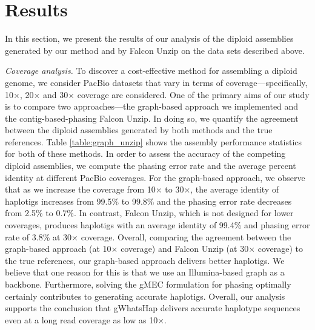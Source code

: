 \section{Results}
In this section, we present the results of our analysis of the diploid assemblies generated by our method and by Falcon Unzip on the data sets described above.

\textit{Coverage analysis.} To discover a cost-effective method for assembling a diploid genome, we consider PacBio datasets that vary in terms of coverage---specifically, 10$\times$, 20$\times$ and 30$\times$ coverage are considered.
One of the primary aims of our study is to compare two approaches---the graph-based approach we implemented and the contig-based-phasing Falcon Unzip. In doing so, we quantify the agreement between the diploid assemblies generated by both methods and the true references.
Table \ref{table:graph_unzip} shows the assembly performance statistics for both of these methods.
In order to assess the accuracy of the competing diploid assemblies, we compute the phasing error rate and the average percent identity at different PacBio coverages.
For the graph-based approach, we observe that as we increase the coverage from 10$\times$ to 30$\times$, the average identity of haplotigs increases from 99.5\% to 99.8\% and 
the phasing error rate decreases from 2.5\% to 0.7\%. In contrast, Falcon Unzip, which is not designed for lower coverages, produces haplotigs with an average identity of 99.4\% and phasing error rate of 3.8\% at 30$\times$ coverage.
Overall, comparing the agreement between the graph-based approach (at 10$\times$ coverage) and Falcon Unzip (at 30$\times$ coverage) to the true references, our graph-based approach delivers better haplotigs.
We believe that one reason for this is that we use an Illumina-based graph as a backbone.
Furthermore, solving the gMEC formulation for phasing optimally certainly contributes to generating accurate haplotigs.
Overall, our analysis supports the conclusion that gWhatsHap delivers accurate haplotype sequences even at a long read coverage as low as 10$\times$.

